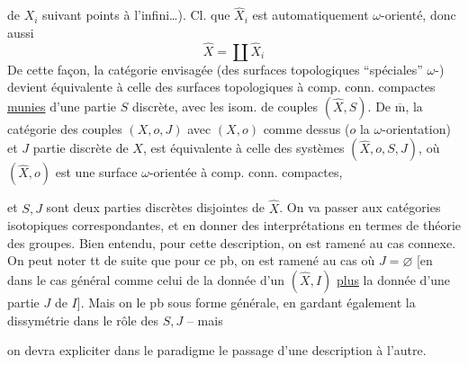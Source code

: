  de $X_i$ suivant  points à l'infini\ldots).
Cl. que $\widehat X_i$ est automatiquement $\omega$-orienté,
donc aussi
\[\widehat X=\coprod\widehat X_i\]
De cette façon, la catégorie envisagée
(des surfaces topologiques ``spéciales''
$\omega$-) devient équivalente à
celle des surfaces topologiques 
à comp. conn. compactes \uline{munies}
d'une partie  $S$ discrète,
avec les isom. de couples $(\widehat X,S)$.
De $\overline{\mathrm m}$, la catégorie des couples
 $(X,o,J)$ avec $(X,o)$ comme
dessus ($o$ la $\omega$-orientation) et
$J$ partie discrète de $X$, est équivalente à celle des systèmes
$(\widehat X,o,S,J)$, où $(\widehat X,o)$ est une surface
$\omega$-orientée à comp. conn. compactes,

et $S,J$ sont deux parties discrètes
disjointes de $\widehat X$.
On va  passer aux catégories
isotopiques correspondantes, et
en donner des interprétations
en termes de théorie des groupes.
Bien entendu, pour cette description,
on est ramené au cas connexe.
On peut  noter tt de suite
que pour ce pb, on est ramené
au cas où $J=\varnothing$ [en 
dans le cas général comme celui
de la donnée d'un $(\widehat X,I)$
\uline{plus} la donnée d'une partie $J$
de $I$].
Mais on  le
pb sous  forme générale, en
gardant également la dissymétrie
dans le rôle des $S,J$ -- mais

on devra expliciter dans le paradigme
le passage d'une description à
l'autre.

